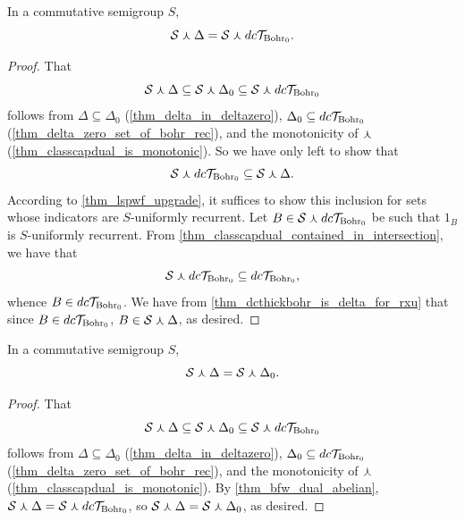 \begin{theorem}
\label{thm_bfw_dual_abelian}
    In a commutative semigroup $S$,
    \[\mathcal{S} \curlywedge \Delta = \mathcal{S} \curlywedge dc\mathcal{T}_{\text{Bohr}_0}.\]
\end{theorem}

\begin{proof}
\leanok{}
    That
    \[\mathcal{S} \curlywedge \Delta \subseteq \mathcal{S} \curlywedge \Delta_0 \subseteq \mathcal{S} \curlywedge dc\mathcal{T}_{\text{Bohr}_0}\]
    follows from $\Delta \subseteq \Delta_0$ (\cref{thm_delta_in_deltazero}), $\Delta_0 \subseteq dc\mathcal{T}_{\text{Bohr}_0}$ (\cref{thm_delta_zero_set_of_bohr_rec}), and the monotonicity of $\curlywedge$ (\cref{thm_classcapdual_is_monotonic}). So we have only left to show that
    \[\mathcal{S} \curlywedge dc\mathcal{T}_{\text{Bohr}_0} \subseteq \mathcal{S} \curlywedge \Delta.\]
    According to \cref{thm_lspwf_upgrade}, it suffices to show this inclusion for sets whose indicators are $S$-uniformly recurrent.  Let $B \in \mathcal{S} \curlywedge dc\mathcal{T}_{\text{Bohr}_0}$ be such that $1_B$ is $S$-uniformly recurrent.  From \cref{thm_classcapdual_contained_in_intersection}, we have that
    \[\mathcal{S} \curlywedge dc\mathcal{T}_{\text{Bohr}_0} \subseteq dc\mathcal{T}_{\text{Bohr}_0},\]
    whence $B \in dc\mathcal{T}_{\text{Bohr}_0}$.  We have from \cref{thm_dcthickbohr_is_delta_for_rxu} that since $B \in dc\mathcal{T}_{\text{Bohr}_0}$, $B \in \mathcal{S} \curlywedge \Delta$, as desired.
\end{proof}

\begin{theorem}
\label{thm_bfw_dual_abelian_v2}
    In a commutative semigroup $S$,
    \[\mathcal{S} \curlywedge \Delta = \mathcal{S} \curlywedge \Delta_0.\]
\end{theorem}

\begin{proof}
\leanok{}
    That
    \[\mathcal{S} \curlywedge \Delta \subseteq \mathcal{S} \curlywedge \Delta_0 \subseteq \mathcal{S} \curlywedge dc\mathcal{T}_{\text{Bohr}_0}\]
    follows from $\Delta \subseteq \Delta_0$ (\cref{thm_delta_in_deltazero}), $\Delta_0 \subseteq dc\mathcal{T}_{\text{Bohr}_0}$ (\cref{thm_delta_zero_set_of_bohr_rec}), and the monotonicity of $\curlywedge$ (\cref{thm_classcapdual_is_monotonic}).  By \cref{thm_bfw_dual_abelian}, $\mathcal{S} \curlywedge \Delta = \mathcal{S} \curlywedge dc\mathcal{T}_{\text{Bohr}_0}$, so $\mathcal{S} \curlywedge \Delta = \mathcal{S} \curlywedge \Delta_0$, as desired.
\end{proof}


